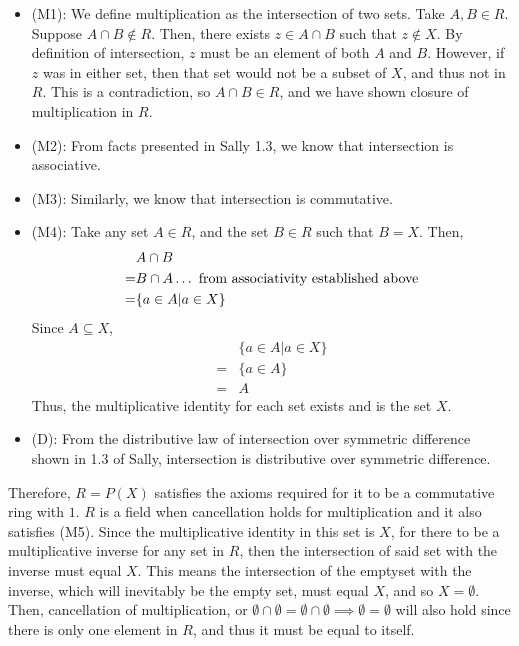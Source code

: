 \documentclass[
]{article}
\begin{document}
\begin{itemize}
\item (M1): We define multiplication as the intersection of two sets.  
Take $A, B \in R$. Suppose $A \cap B \notin R$. Then, there exists $z \in A\cap B$ such that $z \notin X$. By definition of intersection, $z$ must be an element of both $A$ and $B$. However, if $z$ was in either set, then that set would not be a subset of $X$, and thus not in $R$. This is a contradiction, so $A \cap B \in R$, and we have shown closure of multiplication in $R$. 
\item (M2): From facts presented in Sally 1.3, we know that intersection is associative.  
\item (M3): Similarly, we know that intersection is commutative. 
\item (M4): Take any set $A \in R$, and the set $B \in R$ such that $B = X$. Then, \[\begin{aligned} &A \cap B \\ = &B \cap A \space \dots \text{ from associativity established above}\\ = &\{a \in A| a \in X\}\end{aligned}\] 
Since $A \subseteq X$, 
\[\begin{aligned} &\{a \in A| a \in X\} \\ =& \{a \in A\} \\ = & A\end{aligned} \]
Thus, the multiplicative identity for each set exists and is the set $X$.   


\item (D): From the distributive law of intersection over symmetric difference shown in 1.3 of Sally, intersection is distributive over symmetric difference. 
\end{itemize}

Therefore, \(R = P(X)\) satisfies the axioms required for it to be a
commutative ring with \(1\). \(R\) is a field when cancellation holds
for multiplication and it also satisfies (M5). Since the multiplicative
identity in this set is \(X\), for there to be a multiplicative inverse
for any set in \(R\), then the intersection of said set with the inverse
must equal \(X\). This means the intersection of the emptyset with the
inverse, which will inevitably be the empty set, must equal \(X\), and
so \(X = \emptyset\). Then, cancellation of multiplication, or
\(\emptyset \cap \emptyset = \emptyset \cap \emptyset \implies \emptyset = \emptyset\)
will also hold since there is only one element in \(R\), and thus it
must be equal to itself.
\end{document}
